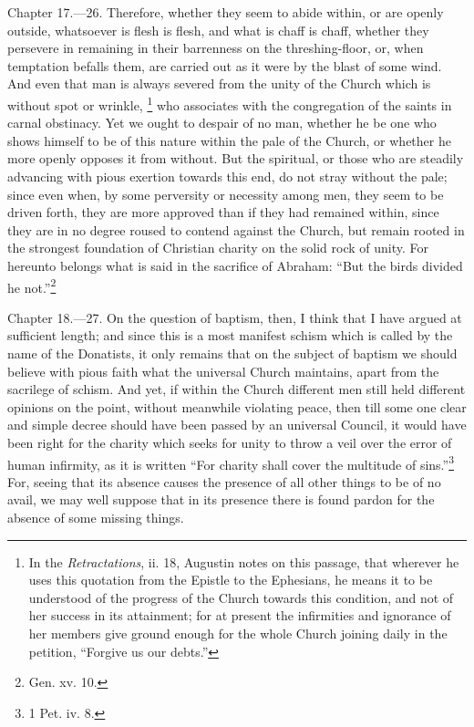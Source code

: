 Chapter 17.—26. Therefore, whether they seem to abide within, or are openly outside, whatsoever is flesh is flesh, and what is chaff is chaff, whether they persevere in remaining in their barrenness on the threshing-floor, or, when temptation befalls them, are carried out as it were by the blast of some wind. And even that man is always severed from the unity of the Church which is without spot or wrinkle, \footnote{\par  In the \emph{Retractations}, ii. 18, Augustin notes on this passage, that wherever he uses this quotation from the Epistle to the Ephesians, he means it to be understood of the progress of the Church towards this condition, and not of her success in its attainment; for at present the infirmities and ignorance of her members give ground enough for the whole Church joining daily in the petition, ``Forgive us our debts.''} who associates with the congregation of the saints in carnal obstinacy. Yet we ought to despair of no man, whether he be one who shows himself to be of this nature within the pale of the Church, or whether he more openly opposes it from without. But the spiritual, or those who are steadily advancing with pious exertion towards this end, do not stray without the pale; since even when, by some perversity or necessity among men, they seem to be driven forth, they are more approved than if they had remained within, since they are in no degree roused to contend against the Church, but remain rooted in the strongest foundation of Christian charity on the solid rock of unity. For hereunto belongs what is said in the sacrifice of Abraham: ``But the birds divided he not.''\footnote{\par  Gen. xv. 10.}


Chapter 18.—27. On the question of baptism, then, I think that I have argued at sufficient length; and since this is a most manifest schism which is called by the name of the Donatists, it only remains that on the subject of baptism we should believe with pious faith what the universal Church maintains, apart from the sacrilege of schism. And yet, if within the Church different men still held different opinions on the point, without meanwhile violating peace, then till some one clear and simple decree should have been passed by an universal Council, it would have been right for the charity which seeks for unity to throw a veil over the error of human infirmity, as it is written ``For charity shall cover the multitude of sins.''\footnote{\par  1 Pet. iv. 8.} For, seeing that its absence causes the presence of all other things to be of no avail, we may well suppose that in its presence there is found pardon for the absence of some missing things.

